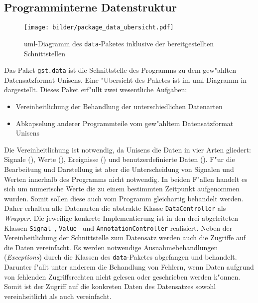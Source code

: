 \subsection{Programminterne Datenstruktur}

\begin{figure}[htb]
\centering
\texttt{[image: bilder/package\_data\_ubersicht.pdf]}
\caption[\acs{uml}-Diagramm des \texttt{data}-Paketes]{\ac{uml}-Diagramm des \texttt{data}-Paketes inklusive der bereitgestellten Schnitt\-stellen}
\label{pic:data_package}
\end{figure}

Das Paket \verb|gst.data| ist die Schnittstelle des Programms zu dem gew"ahlten Datensatzformat Unisens.
Eine "Ubersicht des Paketes ist im \ac{uml}-Diagramm in  dargestellt.
Dieses Paket erf"ullt zwei wesentliche Aufgaben:
\begin{itemize}
	\item Vereinheitlichung der Behandlung der unterschiedlichen Datenarten
	\item Abkapselung anderer Programmteile vom gew"ahltem Datensatzformat Unisens
\end{itemize}

Die Vereinheitlichung ist notwendig, da Unisens die Daten in vier Arten gliedert: Signale (), Werte (), Ereignisse () und benutzerdefinierte Daten ().
F"ur die Bearbeitung und Darstellung ist aber die Unterscheidung von Signalen und Werten innerhalb des Programms nicht notwendig.
In beiden F"allen handelt es sich um numerische Werte die zu einem bestimmten Zeitpunkt aufgenommen wurden.
Somit sollen diese auch vom Programm gleichartig behandelt werden.
Daher erhalten alle Datenarten die abstrakte Klasse \verb|DataController| als \emph{Wrapper}.
Die jeweilige konkrete Implementierung ist in den drei abgeleiteten Klassen \verb|Signal-|, \verb|Value-| und \verb|AnnotationController| realisiert.
Neben der Vereinheitlichung der Schnittstelle zum Datensatz werden auch die Zugriffe auf die Daten vereinfacht.
Es werden notwendige Ausnahmebehandlungen (\emph{Exceptions}) durch die Klassen des \verb|data|-Paketes abgefangen und behandelt.
Darunter f"allt unter anderem die Behandlung von Fehlern, wenn Daten aufgrund von fehlenden Zugriffsrechten nicht gelesen oder geschrieben werden k"onnen.
Somit ist der Zugriff auf die konkreten Daten des Datensatzes sowohl vereinheitlicht als auch vereinfacht.

